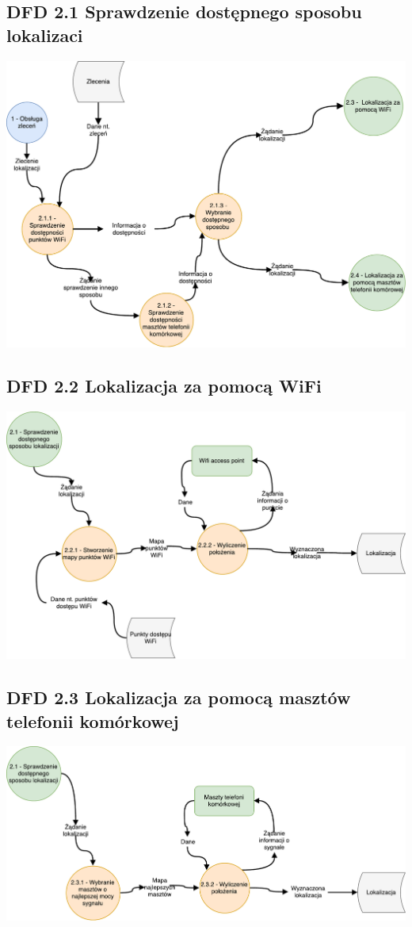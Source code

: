 \documentclass[11pt]{article}
\begin{document}
	\subsection{DFD 2.1 Sprawdzenie dostępnego sposobu lokalizaci}
	\begin{center}
		\includegraphics[scale=0.6]{DFD21.pdf}
	\end{center}
	\subsection{DFD 2.2 Lokalizacja za pomocą WiFi}
	\begin{center}
		\includegraphics[scale=0.6]{DFD22.pdf}
	\end{center}
	\newpage
	\subsection{DFD 2.3 Lokalizacja za pomocą masztów telefonii komórkowej}
	\begin{center}
		\includegraphics[scale=0.65]{DFD23.pdf}
	\end{center}
\end{document}
